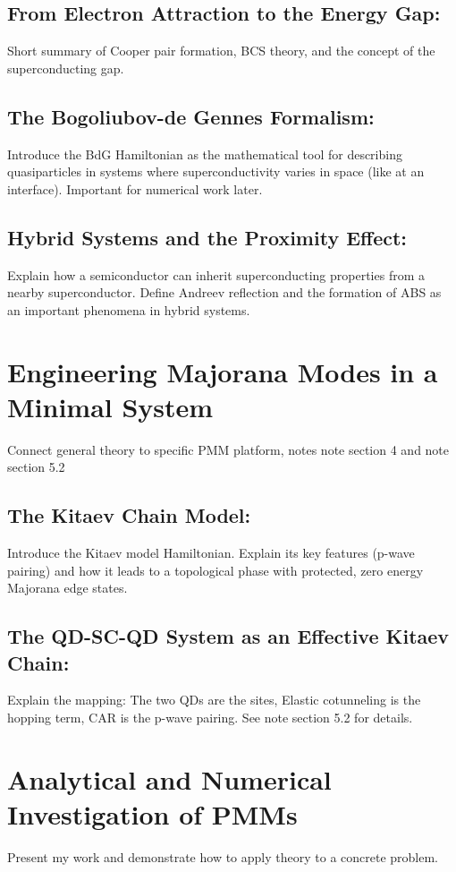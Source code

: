\documentclass[11pt, letterpaper, titlepage]{article}
\begin{document}
\subsection{From Electron Attraction to the Energy Gap:} Short summary of Cooper pair formation, BCS theory, and the concept of the superconducting gap.\par
\subsection{The Bogoliubov-de Gennes Formalism:} Introduce the BdG Hamiltonian as the  mathematical tool for describing quasiparticles in systems where superconductivity varies in space (like at an interface). Important for numerical work later.\par
\subsection{Hybrid Systems and the Proximity Effect:} Explain how a semiconductor can inherit superconducting properties from a nearby superconductor. Define Andreev reflection and the formation of ABS as an important phenomena in hybrid systems.\par

\section{Engineering Majorana Modes in a Minimal System}
Connect general theory to specific PMM platform, notes note section 4 and note section 5.2\par
\subsection{The Kitaev Chain Model:} Introduce the Kitaev model Hamiltonian. Explain its key features (p-wave pairing) and how it leads to a topological phase with protected, zero energy Majorana edge states.\par
\subsection{The QD-SC-QD System as an Effective Kitaev Chain:} Explain the mapping: The two QDs are the sites, Elastic cotunneling is the hopping term, CAR is the p-wave pairing. See note section 5.2 for details.\par

\section{Analytical and Numerical Investigation of PMMs}
Present my work and demonstrate how to apply theory to a concrete problem.\par
\end{document}
